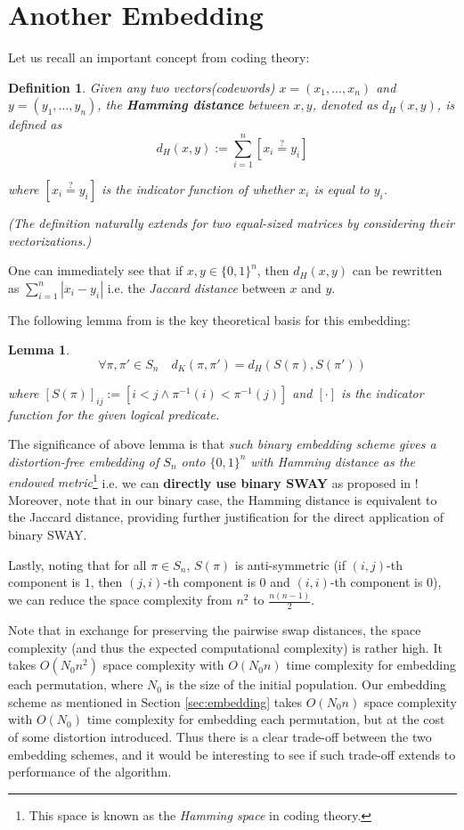 \documentclass[10pt,journal,compsoc]{IEEEtran}
\newtheorem{definition}{Definition}[section]
\newtheorem{lemma}[theorem]{Lemma}
\begin{document}
	
		\appendices
	\section{Another Embedding}
	\label{sec:appendix}
	Let us recall an important concept from coding theory\cite{coding}:
	\begin{definition}
		Given any two vectors(codewords) $x = (x_1, \dots, x_n)$ and $y = (y_1, \dots, y_n)$, the {\bf Hamming distance} between $x, y$, denoted as $d_H(x, y)$, is defined as
		\[ d_H(x, y) := \sum_{i=1}^n \left[x_i \stackrel{?}{=} y_i\right] \]
		
		where $\left[x_i \stackrel{?}{=} y_i\right]$ is the indicator function of whether $x_i$ is equal to $y_i$.
		
		(The definition naturally extends for two equal-sized matrices by considering their vectorizations.)
	\end{definition}
	
	One can immediately see that if $x, y \in \{0, 1\}^n$, then $d_H(x, y)$ can be rewritten as $\sum_{i=1}^n |x_i - y_i|$ i.e. the {\it Jaccard distance} between $x$ and $y$.
	
	The following lemma from \cite{cormode} is the key theoretical basis for this embedding:
	\begin{lemma}
		\[ \forall \pi, \pi' \in S_n \quad d_K(\pi, \pi') = d_H \left( S(\pi), S(\pi') \right) \]
		
		where $[S(\pi)]_{ij} := [i < j \wedge \pi^{-1}(i) < \pi^{-1}(j)]$ and $[\cdot]$ is the indicator function for the given logical predicate.
	\end{lemma}
	
	The significance of above lemma is that {\it such binary embedding scheme gives a distortion-free embedding of $S_n$ onto $\{0, 1\}^n$ with Hamming distance as the endowed metric}\footnote{This space is known as the {\it Hamming space} in coding theory.} i.e. we can {\bf directly use binary SWAY} as proposed in \cite{SWAY}!
	Moreover, note that in our binary case, the Hamming distance is equivalent to the Jaccard distance, providing further justification for the direct application of binary SWAY.
	
	Lastly, noting that for all $\pi \in S_n$, $S(\pi)$ is anti-symmetric (if $(i, j)$-th component is $1$, then $(j, i)$-th component is $0$ and $(i, i)$-th component is $0$), we can reduce the space complexity from $n^2$ to $\frac{n(n-1)}{2}$.
	
	Note that in exchange for preserving the pairwise swap distances, the space complexity (and thus the expected computational complexity) is rather high.
	It takes $O(N_0 n^2)$ space complexity with $O(N_0 n)$ time complexity for embedding each permutation, where $N_0$ is the size of the initial population.
	Our embedding scheme as mentioned in Section \ref{sec:embedding} takes $O(N_0 n)$ space complexity with $O(N_0)$ time complexity for embedding each permutation, but at the cost of some distortion introduced.
	Thus there is a clear trade-off between the two embedding schemes, and it would be interesting to see if such trade-off extends to performance of the algorithm.
	
\end{document}
